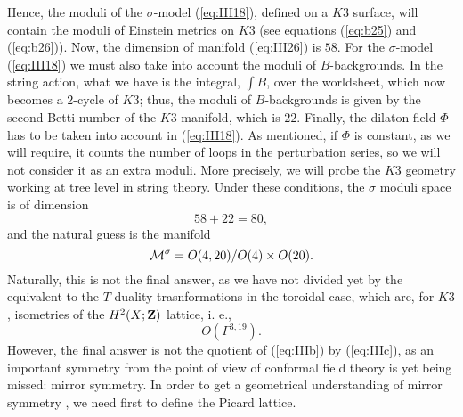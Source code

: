 Hence, the moduli of the $\sigma$-model 
(\ref{eq:III18}), defined on a $K3$ surface, will contain the 
moduli of Einstein metrics on $K3$ (see equations (\ref{eq:b25}) and (\ref{eq:b26})). 
Now, the dimension of manifold (\ref{eq:III26}) is $58$. For the $\sigma$-model 
(\ref{eq:III18}) we must also take into account the moduli of $B$-backgrounds. 
In the string action, what we have is the integral, $\int B$, over the 
worldsheet, which now becomes a $2$-cycle of $K3$; thus, the moduli of $B$-backgrounds 
is given by the second Betti number of the $K3$ manifold, which is $22$. Finally, 
the dilaton field $\Phi$ has to be taken into account in (\ref{eq:III18}). 
As mentioned, if $\Phi$ is constant, as we will require, it counts the number of 
loops in the perturbation series, so we will not consider it as an extra moduli. 
More precisely, we will probe the $K3$ geometry working at tree level in 
string theory. Under these conditions, the $\sigma$ moduli space is 
of dimension \cite{Snew} 
\begin{equation}
58+22=80,
\label{eq:IIIa}
\end{equation}
and the natural guess is the manifold
\begin{equation}
{\cal M}^{\sigma} = O(4,20)/O(4) \times O(20).
\label{eq:IIIb}
\end{equation}
Naturally, this is not the final answer, as we have not divided yet by the 
equivalent to the $T$-duality trasnformations in the toroidal case, which are, 
for $K3$, isometries of the $H^{2}(X;{\bf Z})$ lattice, i. e.,
\begin{equation}
O(\Gamma^{3,19}).
\label{eq:IIIc}
\end{equation}
However, the final answer is not the quotient of (\ref{eq:IIIb}) by 
(\ref{eq:IIIc}), as an important symmetry from the point of view of 
conformal field theory is yet being missed: mirror symmetry. In
order to get a geometrical understanding of mirror symmetry \cite{mirror}, we
need first to define the Picard lattice.
  

